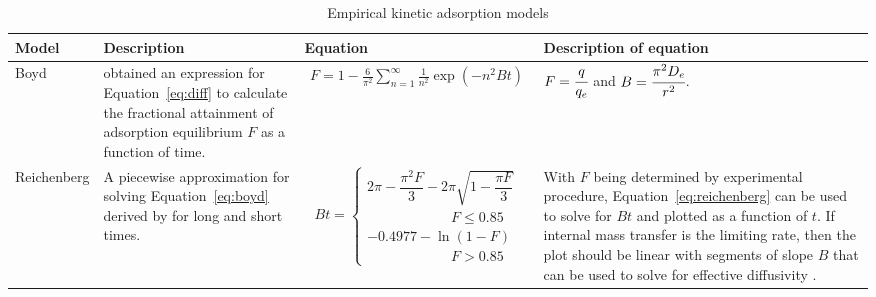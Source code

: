 \begin{landscape}
	\setlength{\extrarowheight}{0.2cm}
	\begin{footnotesize}
		\begin{longtable}{>{\raggedright\arraybackslash}p{2cm}p{6cm}p{6cm}p{7.25cm}}
			
			\caption{Empirical kinetic adsorption models}
			\label{tab:emp_kn} \\
			
			
			\toprule
			Model  & Description & Equation & Description of equation  \\
			\toprule
			\endhead
			
			\bottomrule
			\endfoot
			
			Boyd
			
			&\textcite{Boyd1947} obtained an expression for Equation~\ref{eq:diff} to calculate the fractional attainment of adsorption equilibrium $ F $ as a function of time.
			
			& \begin{align}
			F = 1 - \frac{6}{\pi^2} \sum_{n=1}^\infty  \frac{1}{n^2} \exp \left( - n^2Bt \right) \label{eq:boyd}
			\end{align}  
			
			& $F = \cfrac{q}{q_e}$ and $B = \cfrac{\pi^2 D_e}{r^2}$. \\
			
			
			Reichenberg
			
			& A piecewise approximation for solving Equation~\ref{eq:boyd} derived by \textcite{Reichenberg1953} for long and short times.
					
			& {\begin{equation}
			Bt = 
			\begin{cases}
			2\pi - \dfrac{\pi^2F}{3} - 2\pi \sqrt{ 1 - \dfrac{\pi F}{3}} \\ \quad\quad\quad\quad\quad\quad F \le 0.85 \\
			-0.4977 - \ln\left(1-F \right) \\
			\quad\quad\quad\quad\quad\quad F > 0.85
			\end{cases} \label{eq:reichenberg}
			\end{equation}} 
		
			& With $ F $ being determined by experimental procedure, Equation~\ref{eq:reichenberg} can be used to solve for $ Bt $ and plotted as a function of $ t $. If internal mass transfer is the limiting rate, then the plot should be linear with segments of slope $ B $ that can be used to solve for effective diffusivity \parencite{El-Khaiary2011}.	\\
			

\end{longtable}
\end{footnotesize}
\end{landscape}
